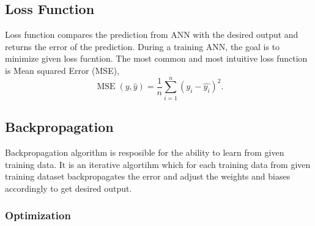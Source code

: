 \subsection{Loss Function}

Loss function compares the prediction from ANN with the desired output and returns the error of the prediction.
During a training ANN, the goal is to minimize given loss fucntion.
The most common and most intuitive loss function is Mean squared Error (MSE),
\[ \operatorname{MSE}(y, \hat{y}) = \frac{1}{n}\sum_{i=1}^n(y_i-\hat{y_i})^2. \]


\subsection{Backpropagation}

Backpropagation algorithm is resposible for the ability to learn from given training data.
It is an iterative algortihm which for each training data %
from given training dataset backpropagates the error and adjust the weights and biases accordingly to get desired output.

\subsubsection{Optimization}

